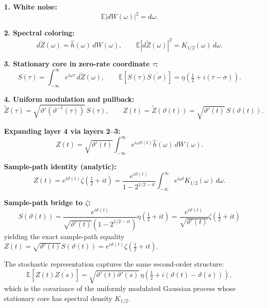 \documentclass[11pt,a4paper]{article}
\begin{document}
\noindent\textbf{1. White noise:}
\[
  \mathbb{E}|dW(\omega)|^2=d\omega.
\]

\noindent\textbf{2. Spectral coloring:}
\[
  d\widetilde{Z}(\omega)=\hat{h}(\omega)\,dW(\omega),
  \qquad
  \mathbb{E}|d\widetilde{Z}(\omega)|^2=K_{1/2}(\omega)\,d\omega.
\]

\noindent\textbf{3. Stationary core in zero-rate coordinate $\tau$:}
\[
  S(\tau)=\int_{-\infty}^{\infty} e^{i\omega\tau}\,d\widetilde{Z}(\omega),
  \qquad
  \mathbb{E}[S(\tau)\overline{S(\sigma)}]=\eta\!\left(\tfrac{1}{2}+i(\tau-\sigma)\right).
\]

\noindent\textbf{4. Uniform modulation and pullback:}
\[
  \widetilde{Z}(\tau)=\sqrt{\vartheta'(\vartheta^{-1}(\tau))}\,S(\tau),
  \qquad
  Z(t)=\widetilde{Z}(\vartheta(t))
      =\sqrt{\vartheta'(t)}\,S(\vartheta(t)).
\]

\noindent\textbf{Expanding layer 4 via layers 2--3:}
\[
  Z(t)=\sqrt{\vartheta'(t)}\int_{-\infty}^{\infty}
        e^{i\omega\vartheta(t)}\hat{h}(\omega)\,dW(\omega).
\]

\noindent\textbf{Sample-path identity (analytic):}
\[
  Z(t)=e^{i\vartheta(t)}\zeta\!\left(\tfrac{1}{2}+it\right)
      =\frac{e^{i\vartheta(t)}}{1-2^{1/2-it}}
       \int_{-\infty}^{\infty} e^{i\omega t}K_{1/2}(\omega)\,d\omega.
\]

\noindent\textbf{Sample-path bridge to $\zeta$:}
\[
  S(\vartheta(t)) = \frac{e^{i\vartheta(t)}}{\sqrt{\vartheta'(t)}\left(1-2^{1/2-it}\right)}\eta\!\left(\tfrac{1}{2}+it\right) = \frac{e^{i\vartheta(t)}}{\sqrt{\vartheta'(t)}}\zeta\!\left(\tfrac{1}{2}+it\right)
\]
yielding the exact sample-path equality $Z(t) = \sqrt{\vartheta'(t)}S(\vartheta(t)) = e^{i\vartheta(t)}\zeta(\tfrac{1}{2}+it)$.

\bigskip
\noindent The stochastic representation captures the same second-order structure:
\[
  \mathbb{E}[Z(t)\overline{Z(s)}]
  =\sqrt{\vartheta'(t)\vartheta'(s)}\,
   \eta\!\left(\tfrac{1}{2}+i(\vartheta(t)-\vartheta(s))\right),
\]
which is the covariance of the uniformly modulated Gaussian process whose
stationary core has spectral density $K_{1/2}$.
\end{document}

